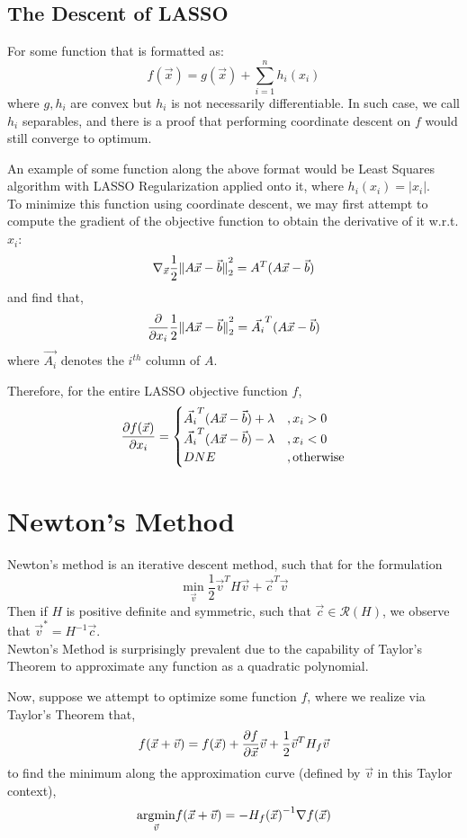\subsection{The Descent of LASSO}
For some function that is formatted as:
\[
    f(\vec{x}) = g(\vec{x}) + \sum_{i = 1}^n h_i (x_i)
\]
where $g, h_i$ are convex but $h_i$ is not necessarily differentiable.
In such case, we call $h_i$ separables, and there is a proof that performing coordinate descent on $f$ would still converge to optimum.

An example of some function along the above format would be Least Squares algorithm with LASSO Regularization applied onto it, where $h_i(x_i) = |x_i|$. \\
To minimize this function using coordinate descent, we may first attempt to compute the gradient of the objective function to obtain the derivative of it w.r.t. $x_i$:
\[
    \nabla_{\vec{x}} \frac{1}{2} \pnorm[2]{A \vec{x} - \vec{b}}{2} = A^T (A \vec{x} - \vec{b})
\]
and find that,
\[
    \frac{\partial}{\partial x_i} \frac{1}{2} \pnorm[2]{A \vec{x} - \vec{b}}{2} = \vec{A_i}^T (A \vec{x} - \vec{b})
\]
where $\vec{A_i}$ denotes the $i^{th}$ column of $A$.

Therefore, for the entire LASSO objective function $f$,
\[
    \pdv{f(\vec{x})}{x_i} =
    \begin{cases}
        \vec{A_i}^T (A \vec{x} - \vec{b}) + \lambda &, x_i > 0 \\
        \vec{A_i}^T (A \vec{x} - \vec{b}) - \lambda &, x_i < 0 \\
        DNE &, \text{otherwise}
    \end{cases}
\]

\section{Newton's Method}
Newton's method is an iterative descent method, such that for the formulation
\[
    \min_{\vec{v}} \frac{1}{2} \vec{v}^T H \vec{v} + \vec{c}^T \vec{v}
\]
Then if $H$ is positive definite and symmetric, such that $\vec{c} \in \mathcal{R}(H)$, we observe that $\vec{v}^* = H^{-1} \vec{c}$. \\
Newton's Method is surprisingly prevalent due to the capability of Taylor's Theorem to approximate any function as a quadratic polynomial.

Now, suppose we attempt to optimize some function $f$, where we realize via Taylor's Theorem that,
\[
    f(\vec{x} + \vec{v}) = f(\vec{x}) + \pdv{f}{\vec{x}} \vec{v} + \frac{1}{2} \vec{v}^T H_f \vec{v}
\]
to find the minimum along the approximation curve (defined by $\vec{v}$ in this Taylor context), 
\[
    \underset{\vec{v}}{\rm argmin} f(\vec{x} + \vec{v}) = -{H_f(\vec{x})}^{-1} \nabla f(\vec{x})
\]

